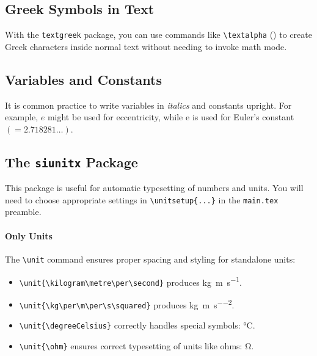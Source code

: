 \subsection{Greek Symbols in Text}

    With the \verb|textgreek| package, you can use commands like \verb|\textalpha| (\textalpha) to create Greek characters inside normal text without needing to invoke math mode.

\subsection{Variables and Constants}

    It is common practice to write variables in \textit{italics} and constants upright. For example, $e$ might be used for eccentricity, while $\mathrm{e}$ is used for Euler's constant $(=\num{2.718281}\dots)$.


\subsection{The \texttt{siunitx} Package}

    This package is useful for automatic typesetting of numbers and units. You will need to choose appropriate settings in \verb|\unitsetup{...}| in the \verb|main.tex| preamble. %

    \paragraph*{Only Units}

    The \verb|\unit| command ensures proper spacing and styling for standalone units:
    \begin{itemize}
        \item \verb|\unit{\kilogram\metre\per\second}| produces \unit{\kilogram\metre\per\second}.
        \item \verb|\unit{\kg\per\m\per\s\squared}| produces \unit{\kg\per\m\per\s\squared}.
        \item \verb|\unit{\degreeCelsius}| correctly handles special symbols: \unit{\degreeCelsius}.
        \item \verb|\unit{\ohm}| ensures correct typesetting of units like ohms: \unit{\ohm}.
    \end{itemize}

